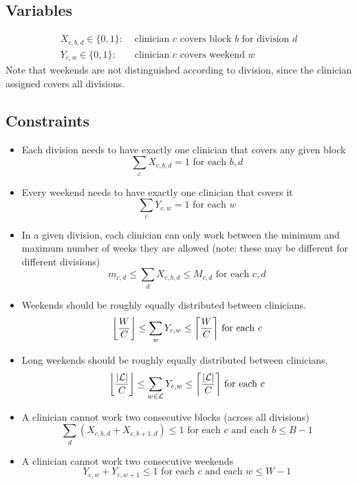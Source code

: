 \documentclass[]{article}
\newcommand{\mc}{\mathcal}
\DeclarePairedDelimiter{\floor}{\lfloor}{\rfloor}
\DeclarePairedDelimiter{\ceil}{\lceil}{\rceil}
\begin{document}
\subsection{Variables}
	\begin{align}
		X_{c, b, d} \in \{0, 1\}: &\text{ clinician $c$ covers block $b$ for division $d$} \\
		Y_{c, w} \in \{0, 1\}: &\text{ clinician $c$ covers weekend $w$}
	\end{align}
Note that weekends are not distinguished according to division, since the clinician assigned covers all divisions.

\subsection{Constraints} \label{constraints}
	\begin{itemize}
		\item Each division needs to have exactly one clinician that covers any given block
			\begin{equation}
				\sum_{c} X_{c, b, d} = 1 \text{ for each } b, d
			\end{equation}
		\item Every weekend needs to have exactly one clinician that covers it
			\begin{equation}
				\sum_{c} Y_{c, w} = 1 \text{ for each } w
			\end{equation}
		\item In a given division, each clinician can only work between the minimum and maximum number of weeks they are allowed (note: these may be different for different divisions)
			\begin{equation}
				m_{c, d} \leq \sum_{d} X_{c, b, d} \leq M_{c, d} \text{ for each } c, d
			\end{equation}
		\item Weekends should be roughly equally distributed between clinicians.
			\begin{equation}
				\floor*{ \frac{W}{C} } \leq \sum_{w} Y_{c, w} \leq \ceil*{ \frac{W}{C} } \text{ for each } c
			\end{equation}
		\item Long weekends should be roughly equally distributed between clinicians.
			\begin{equation}
				\floor*{\frac{|\mc{L}|}{C}} \leq \sum_{w \in \mc{L}} Y_{c, w} \leq \ceil*{\frac{|\mc{L}|}{C}} \text{ for each } c
			\end{equation}
		\item A clinician cannot work two consecutive blocks (across all divisions)
			\begin{equation}
				\sum_d \left(X_{c, b, d} + X_{c, b+1, d}\right) \leq 1 \text{ for each $c$ and each $b \leq B - 1$}
			\end{equation}
		\item A clinician cannot work two consecutive weekends
			\begin{equation}
				Y_{c, w} + Y_{c, w+1} \leq 1 \text{ for each $c$ and each $w \leq W - 1$}
			\end{equation}
	\end{itemize}
\end{document}
